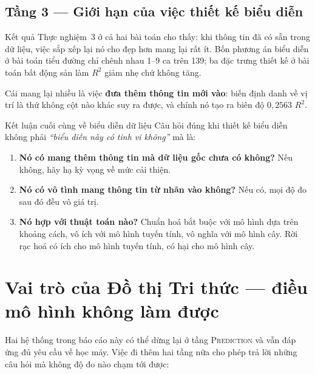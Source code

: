 \subsection{Tầng 3 --- Giới hạn của việc thiết kế biểu diễn}

Kết quả Thực nghiệm~3 ở cả hai bài toán cho thấy: khi thông tin đã có sẵn trong
dữ liệu, việc sắp xếp lại nó cho đẹp hơn mang lại rất ít. Bốn phương án biểu
diễn ở bài toán tiểu đường chỉ chênh nhau 1--9 ca trên 139; ba đặc trưng thiết
kế ở bài toán bất động sản làm $R^2$ giảm nhẹ chứ không tăng.

Cái mang lại nhiều là việc \textbf{đưa thêm thông tin mới vào}: biến định danh
về vị trí là thứ không cột nào khác suy ra được, và chính nó tạo ra biên độ
$0{,}2563$ $R^2$.

\begin{phathien}{Kết luận cuối cùng về biểu diễn dữ liệu}
Câu hỏi đúng khi thiết kế biểu diễn không phải \emph{``biểu diễn này có tinh vi
không''} mà là:

\begin{enumerate}
  \item \textbf{Nó có mang thêm thông tin mà dữ liệu gốc chưa có không?} Nếu
        không, hãy hạ kỳ vọng về mức cải thiện.
  \item \textbf{Nó có vô tình mang thông tin từ nhãn vào không?} Nếu có, mọi độ
        đo sau đó đều vô giá trị.
  \item \textbf{Nó hợp với thuật toán nào?} Chuẩn hoá bắt buộc với mô hình dựa
        trên khoảng cách, vô ích với mô hình tuyến tính, vô nghĩa với mô hình
        cây. Rời rạc hoá có ích cho mô hình tuyến tính, có hại cho mô hình cây.
\end{enumerate}
\end{phathien}

\section{Vai trò của Đồ thị Tri thức --- điều mô hình không làm được}
\label{sec:vaitro-kg}

Hai hệ thống trong báo cáo này có thể dừng lại ở tầng \textsc{Prediction} và vẫn
đáp ứng đủ yêu cầu về học máy. Việc đi thêm hai tầng nữa cho phép trả lời những
câu hỏi mà không độ đo nào chạm tới được:

